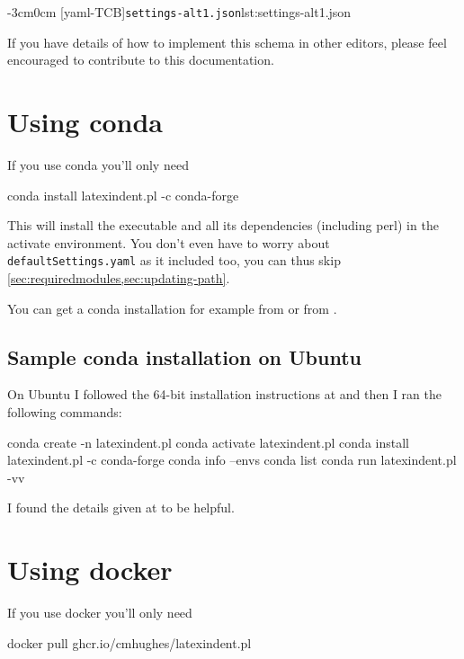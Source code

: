 \documentclass[10pt]{article}
\newenvironment{widepage}{\begin{adjustwidth}{-3cm}{0cm}}{\end{adjustwidth}}
\begin{document}
  \begin{widepage}
   [yaml-TCB]{\texttt{settings-alt1.json}}{lst:settings-alt1.json}
  \end{widepage}

  If you have details of how to implement this schema in other editors, please feel
  encouraged to contribute to this documentation.

 \section{Using conda}\label{sec:app:conda}
  If you use conda you'll only need

  \begin{commandshell}
conda install latexindent.pl -c conda-forge
\end{commandshell}

  This will install the executable and all its dependencies (including perl) in the
  activate environment. You don't even have to worry about \texttt{defaultSettings.yaml}
  as it included too, you can thus skip \cref{sec:requiredmodules,sec:updating-path}.

  You can get a conda installation for example from \cite{conda} or from \cite{anacoda}.

 \subsection{Sample conda installation on Ubuntu}
  On Ubuntu I followed the 64-bit installation instructions at \cite{condainstallubuntu}
  and then I ran the following commands:

  \begin{commandshell}
conda create -n latexindent.pl
conda activate latexindent.pl
conda install latexindent.pl -c conda-forge
conda info --envs
conda list
conda run latexindent.pl -vv
\end{commandshell}

  I found the details given at \cite{condainstallhelp} to be helpful.

 \section{Using docker}\label{sec:app:docker}
  If you use docker you'll only need 

  \begin{commandshell}
docker pull ghcr.io/cmhughes/latexindent.pl
\end{commandshell}
\end{document}
